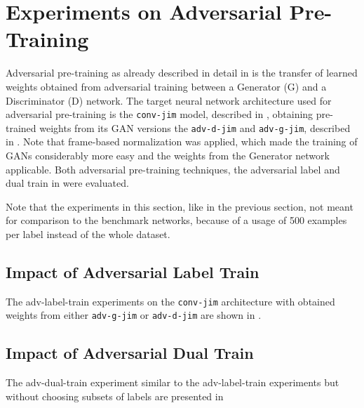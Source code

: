 
\section{Experiments on Adversarial Pre-Training}\label{sec:exp_adv}
\thesisStateNotReady
Adversarial pre-training as already described in detail in  is the transfer of learned weights obtained from adversarial training between a Generator (G) and a Discriminator (D) network.
The target neural network architecture used for adversarial pre-training is the \texttt{conv-jim} model, described in , obtaining pre-trained weights from its GAN versions the \texttt{adv-d-jim} and \texttt{adv-g-jim}, described in .
Note that frame-based normalization was applied, which made the training of GANs considerably more easy and the weights from the Generator network applicable.
Both adversarial pre-training techniques, the adversarial label and dual train in  were evaluated.

Note that the experiments in this section, like in the previous section, not meant for comparison to the benchmark networks, because of a usage of 500 examples per label instead of the whole dataset.



\subsection{Impact of Adversarial Label Train}
The adv-label-train experiments on the \texttt{conv-jim} architecture with obtained weights from either \texttt{adv-g-jim} or \texttt{adv-d-jim} are shown in .




\subsection{Impact of Adversarial Dual Train}
The adv-dual-train experiment similar to the adv-label-train experiments but without choosing subsets of labels are presented in 




